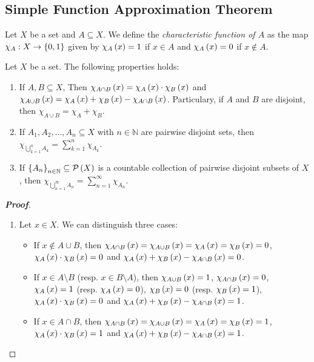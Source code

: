 \subsection{Simple Function Approximation Theorem}

\begin{definition}
  Let $X$ be a set and $A\subseteq X$. We define the \emph{characteristic function of $A$} as the map $\chi_A:X\rightarrow\left\{0,1\right\}$ given by $\chi_A\left(x\right)=1$ if $x\in A$ and $\chi_A\left(x\right)=0$ if $x\notin A$.
\end{definition}

\begin{proposition}
  Let $X$ be a set. The following properties holds:
  \begin{enumerate}
    \item If $A,B\subseteq X$, Then $\chi_{A\cap B}\left(x\right)=\chi_A\left(x\right)\cdot\chi_B\left(x\right)$ and $\chi_{A\cup B}\left(x\right)=\chi_A\left(x\right)+\chi_B\left(x\right)-\chi_{A\cap B}\left(x\right)$. Particulary, if $A$ and $B$ are disjoint, then $\chi_{A\cup B}=\chi_A+\chi_B$.
    \item If $A_1,A_2,\dots,A_n\subseteq X$ with $n\in\mathbb{N}$ are pairwise disjoint sets, then $\chi_{\bigcup_{k=1}^{n}{A_k}}=\sum_{k=1}^{n}{\chi_{A_k}}$.
    \item If $\left\{A_n\right\}_{n\in\mathbb{N}}\subseteq\mathcal{P}\left(X\right)$ is a countable collection of pairwise disjoint subsets of $X$, then $\chi_{\bigcup_{n=1}^{\infty}{A_n}}=\sum_{n=1}^{\infty}{\chi_{A_n}}$.
  \end{enumerate}
  \begin{proof}[\rm\textbf{Proof}]
    \hfill
    \begin{enumerate}
      \item Let $x\in X$. We can distinguish three cases:
      \begin{itemize}
        \item If $x\notin A\cup B$, then $\chi_{A\cap B}\left(x\right)=\chi_{A\cup B}\left(x\right)=\chi_A\left(x\right)=\chi_B\left(x\right)=0$, $\chi_A\left(x\right)\cdot\chi_B\left(x\right)=0$ and $\chi_A\left(x\right)+\chi_B\left(x\right)-\chi_{A\cap B}\left(x\right)=0$.
        \item If $x\in A\setminus B$ (resp. $x\in B\setminus A$), then $\chi_{A\cup B}\left(x\right)=1$, $\chi_{A\cap B}\left(x\right)=0$, $\chi_A\left(x\right)=1$ (resp. $\chi_A\left(x\right)=0$), $\chi_B\left(x\right)=0$ (resp. $\chi_B\left(x\right)=1$), $\chi_A\left(x\right)\cdot\chi_B\left(x\right)=0$ and $\chi_A\left(x\right)+\chi_B\left(x\right)-\chi_{A\cap B}\left(x\right)=1$.
        \item If $x\in A\cap B$, then $\chi_{A\cap B}\left(x\right)=\chi_{A\cup B}\left(x\right)=\chi_A\left(x\right)=\chi_B\left(x\right)=1$, $\chi_A\left(x\right)\cdot\chi_B\left(x\right)=1$ and $\chi_A\left(x\right)+\chi_B\left(x\right)-\chi_{A\cap B}\left(x\right)=1$.
      \end{itemize}


\end{enumerate}
\end{proof}
\end{proposition}
